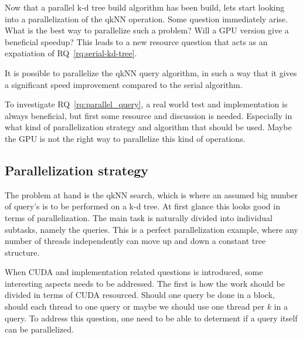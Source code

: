 





Now that a parallel k-d tree build algorithm has been build, lets start looking into a parallelization of the qkNN operation. Some question immediately arise. What is the best way to parallelize such a problem? Will a GPU version give a beneficial speedup? This leads to a new resource question that acts as an expatiation of RQ~\ref{rq:serial-kd-tree}.


\begin{myrq}
\label{rq:parallel_query}
    It is possible to parallelize the qkNN query algorithm, in such a way that it gives a significant speed improvement compared to the serial algorithm.
\end{myrq}


To investigate RQ~\ref{rq:parallel_query}, a real world test and implementation is always beneficial, but first some resource and discussion is needed. Especially in what kind of parallelization strategy and algorithm that should be used. Maybe the GPU is not the right way to parallelize this kind of operations.


\subsection{Parallelization strategy} %
\label{sub:parallelization_strategy}


The problem at hand is the qkNN search, which is where an assumed big number of query's is to be performed on a k-d tree. At first glance this looks good in terms of parallelization. The main task is naturally divided into individual subtasks, namely the queries. This is a perfect parallelization example, where any number of threads independently can move up and down a constant tree structure.

When CUDA and implementation related questions is introduced, some interesting aspects needs to be addressed. The first is how the work should be divided in terms of CUDA resourced. Should one query be done in a block, should each thread to one query or maybe we should use one thread per $k$ in a query. To address this question, one need to be able to determent if a query itself can be parallelized.

